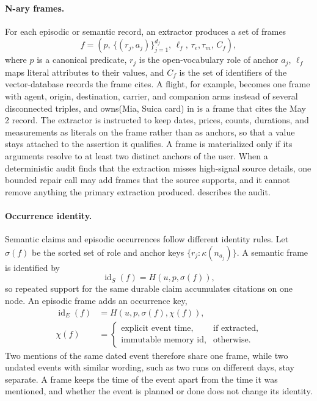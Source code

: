 \paragraph{N-ary frames.}
For each episodic or semantic record, an extractor produces a set of frames
\begin{equation}
    f=
    \left(
        p,\,
        \{(r_j,a_j)\}_{j=1}^{d_f},\,
        \ell_f,\,
        \tau_e,\tau_m,\,
        C_f
    \right),
    \label{eq:frame}
\end{equation}
where \(p\) is a canonical predicate, \(r_j\) is the open-vocabulary role of
anchor \(a_j\), \(\ell_f\) maps literal attributes to their values, and \(C_f\)
is the set of identifiers of the vector-database records the frame cites. A flight, for example,
becomes one frame with agent, origin, destination, carrier, and companion arms
instead of several disconnected triples, and owns(Mia, Suica card) in
 is a frame that cites the May 2 record. The extractor is instructed to keep dates, prices, counts, durations, and
measurements as literals on the frame rather than as anchors, so that a value
stays attached to the assertion it qualifies. A frame is materialized only if
its arguments resolve to at least two distinct anchors of the user. When a deterministic audit finds that
the extraction misses high-signal source details, one bounded repair call may
add frames that the source supports, and it cannot remove anything the primary
extraction produced.  describes the audit.

\paragraph{Occurrence identity.}
Semantic claims and episodic occurrences follow different identity rules. Let
\(\sigma(f)\) be the sorted set of role and anchor keys
\(\{r_j:\kappa(n_{a_j})\}\). A semantic frame is identified by
\begin{equation}
    \operatorname{id}_S(f)
    =H(u,p,\sigma(f)),
    \label{eq:semantic-frame-id}
\end{equation}
so repeated support for the same durable claim accumulates citations on one
node. An episodic frame adds an occurrence key,
\begin{align}
    \operatorname{id}_E(f)
        &=H(u,p,\sigma(f),\chi(f)), \label{eq:episodic-frame-id}\\
    \chi(f)
        &=
        \begin{cases}
        \text{explicit event time}, & \text{if extracted},\\
        \text{immutable memory id}, & \text{otherwise}.
        \end{cases}
\end{align}
Two mentions of the same dated event therefore share one frame, while two undated
events with similar wording, such as two runs on different days, stay separate. A
frame keeps the time of the event apart from the time it was mentioned, and whether
the event is planned or done does not change its identity.


